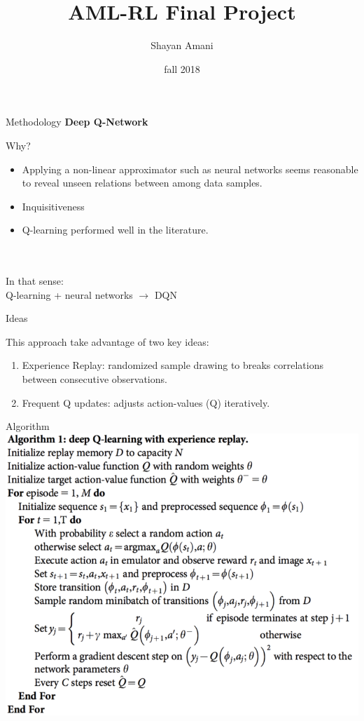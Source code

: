 \documentclass{beamer}
\title{AML-RL Final Project}
\author{Shayan Amani}
\date{fall 2018}
\institute{Department of Computer Science, University of New Hampshire}
\begin{document}
\begin{frame}
    \titlepage
\end{frame}

\begin{frame}{Methodology}
\textbf{Deep Q-Network}

Why?
\begin{itemize}
    \item Applying a non-linear approximator such as neural networks seems reasonable to reveal unseen relations between among data samples.
    \item Inquisitiveness 
    \item Q-learning performed well in the literature.
\end{itemize} \\\\
In that sense: \\
\centering  Q-learning + neural networks $\rightarrow$ DQN
\end{frame}



\begin{frame}{Ideas}

  This approach take advantage of two key ideas:
  \begin{enumerate}
      \item Experience Replay: randomized sample drawing to breaks correlations between consecutive observations.
      \item Frequent Q updates: adjusts action-values (Q) iteratively.
  \end{enumerate}
\end{frame}

\begin{frame}{Algorithm}
\includegraphics[scale=0.3]{alg-dqn.png}
    
\end{frame}
\end{document}
